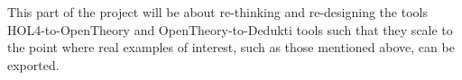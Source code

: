 



This part of the project will be about re-thinking and re-designing
the tools HOL4-to-OpenTheory and OpenTheory-to-Dedukti tools such that
they scale to the point where real examples of interest, such as those
mentioned above, can be exported.


